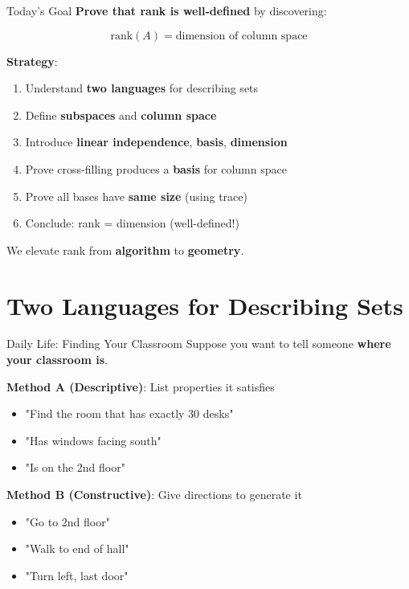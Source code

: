 \documentclass[10pt]{beamer}
\theoremstyle{definition}
\newcommand{\x}[1]{\alert{\textbf{#1}}}
\begin{document}
\begin{frame}{Today's Goal}
\x{Prove that rank is well-defined} by discovering:

$$\boxed{\text{rank}(A) = \text{dimension of column space}}$$

\vfill
\textbf{Strategy}:
\begin{enumerate}
\item Understand \x{two languages} for describing sets
\item Define \x{subspaces} and \x{column space}
\item Introduce \x{linear independence}, \x{basis}, \x{dimension}
\item Prove cross-filling produces a \x{basis} for column space
\item Prove all bases have \x{same size} (using trace)
\item Conclude: rank = dimension (well-defined!)
\end{enumerate}

\vfill
We elevate rank from \x{algorithm} to \x{geometry}.
\end{frame}

\section{Two Languages for Describing Sets}

\begin{frame}{Daily Life: Finding Your Classroom}
Suppose you want to tell someone \x{where your classroom is}.

\vfill
\textbf{Method A (Descriptive)}: List properties it satisfies
\begin{itemize}
\item "Find the room that has exactly 30 desks"
\item "Has windows facing south"
\item "Is on the 2nd floor"
\end{itemize}

\vfill
\textbf{Method B (Constructive)}: Give directions to generate it
\begin{itemize}
\item "Go to 2nd floor"
\item "Walk to end of hall"
\item "Turn left, last door"
\end{itemize}
\end{frame}
\end{document}
